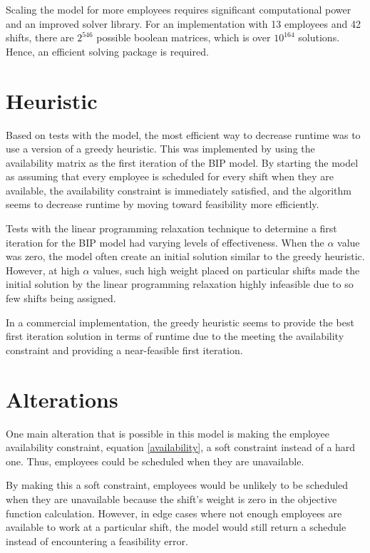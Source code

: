 Scaling the model for more employees requires significant computational power and an improved solver library. For an implementation with 13 employees and 42 shifts, there are $2^{546}$ possible boolean matrices, which is over $10^{164}$ solutions. Hence, an efficient solving package is required.

\section{Heuristic}

Based on tests with the model, the most efficient way to decrease runtime was to use a version of a greedy heuristic. This was implemented by using the availability matrix as the first iteration of the BIP model. By starting the model as assuming that every employee is scheduled for every shift when they are available, the availability constraint is immediately satisfied, and the algorithm seems to decrease runtime by moving toward feasibility more efficiently. 

Tests with the linear programming relaxation technique to determine a first iteration for the BIP model had varying levels of effectiveness. When the $\alpha$ value was zero, the model often create an initial solution similar to the greedy heuristic. However, at high $\alpha$ values, such high weight placed on particular shifts made the initial solution by the linear programming relaxation highly infeasible due to so few shifts being assigned. 

In a commercial implementation, the greedy heuristic seems to provide the best first iteration solution in terms of runtime due to the meeting the availability constraint and providing a near-feasible first iteration. 


\section{Alterations}

One main alteration that is possible in this model is making the employee availability constraint, equation \eqref{availability}, a soft constraint instead of a hard one. Thus, employees could be scheduled when they are unavailable. 

By making this a soft constraint, employees would be unlikely to be scheduled when they are unavailable because the shift's weight is zero in the objective function calculation. However, in edge cases where not enough employees are available to work at a particular shift, the model would still return a schedule instead of encountering a feasibility error. 

